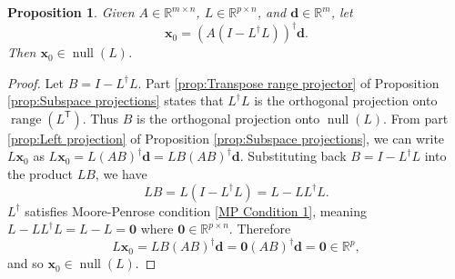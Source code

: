 \documentclass[12pt]{article}
\newcommand{\dVec}{\mathbf{d}}	%
\newcommand{\xVec}{\mathbf{x}}	%
\newcommand{\trans}[1]{{#1}^\mathsf{T}}	%
\newcommand{\pinv}[1]{{#1}^\dagger}	%
\DeclareMathOperator{\range}{range}	%
\DeclareMathOperator{\nullspace}{null}	%
\newcommand{\zeroVec}{\bm{0}}	%
\newtheorem{proposition}{Proposition}[section]
\begin{document}
\begin{proposition}
\label{prop:Nullspace of L}
Given $A \in \mathbb{R}^{m \times n}$, $L \in \mathbb{R}^{p \times n}$, and $\dVec \in \mathbb{R}^m$, let
\[\xVec_0 = \pinv{\left(A\left(I - \pinv{L}L\right)\right)}\dVec.\]
Then $\xVec_0 \in \nullspace(L)$.
\end{proposition}
\begin{proof}
Let $B = I - \pinv{L}L$. Part \ref{prop:Transpose range projector} of Proposition \ref{prop:Subspace projections} states that $\pinv{L}L$ is the orthogonal projection onto $\range(\trans{L})$. Thus $B$ is the orthogonal projection onto $\nullspace(L)$. From part \ref{prop:Left projection} of Proposition \ref{prop:Subspace projections}, we can write $L\xVec_0$ as $L\xVec_0 = L\pinv{\left(AB\right)}\dVec = LB\pinv{\left(AB\right)}\dVec$. Substituting back $B = I - \pinv{L}L$ into the product $LB$, we have
\[LB = L\left(I - \pinv{L}L\right) = L - L\pinv{L}L.\]
$\pinv{L}$ satisfies Moore-Penrose condition \ref{MP Condition 1}, meaning $L - L\pinv{L}L = L - L = \zeroVec$ where $\zeroVec \in \mathbb{R}^{p \times n}$. Therefore
\[L\xVec_0 = LB\pinv{\left(AB\right)}\dVec = \zeroVec\pinv{\left(AB\right)}\dVec = \zeroVec \in \mathbb{R}^{p},\]
and so $\xVec_0 \in \nullspace(L)$.
\end{proof}
\end{document}
